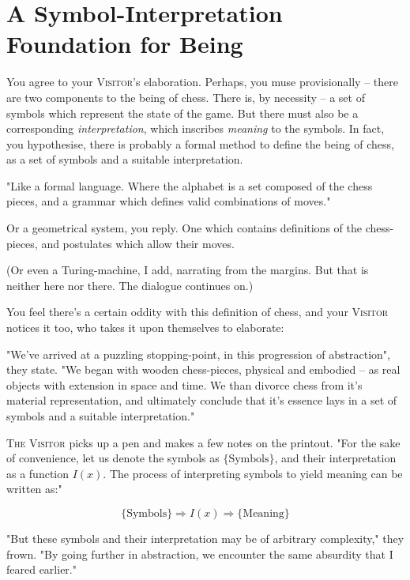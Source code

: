 \section{A Symbol-Interpretation Foundation for Being}

You agree to your \textsc{Visitor}'s elaboration. Perhaps, you muse provisionally -- there are two components to the being of chess. There is, by necessity -- a set of symbols which represent the state of the game. But there must also be a corresponding \emph{interpretation}, which inscribes \emph{meaning} to the symbols. In fact, you hypothesise, there is probably a formal method to define the being of chess, as a set of symbols and a suitable interpretation.

"Like a formal language. Where the alphabet is a set composed of the chess pieces, and a grammar which defines valid combinations of moves."

Or a geometrical system, you reply. One which contains definitions of the chess-pieces, and postulates which allow their moves.

(Or even a Turing-machine, I add, narrating from the margins. But that is neither here nor there. The dialogue continues on.)

You feel there's a certain oddity with this definition of chess, and your \textsc{Visitor} notices it too, who takes it upon themselves to elaborate:

"We've arrived at a puzzling stopping-point, in this progression of abstraction", they state. "We began with wooden chess-pieces, physical and embodied -- as real objects with extension in space and time. We than divorce chess from it's material representation, and ultimately conclude that it's essence lays in a set of symbols and a suitable interpretation."

\textsc{The Visitor} picks up a pen and makes a few notes on the printout. "For the sake of convenience, let us denote the symbols as $\{\text{Symbols}\}$, and their interpretation as a function $I(x)$. The process of interpreting symbols to yield meaning can be written as:"

\begin{equation*}
  \{\text{Symbols}\} \Rightarrow I(x) \Rightarrow \{\text{Meaning}\}
\end{equation*}

"But these symbols and their interpretation may be of arbitrary complexity," they frown. "By going further in abstraction, we encounter the same absurdity that I feared earlier."

